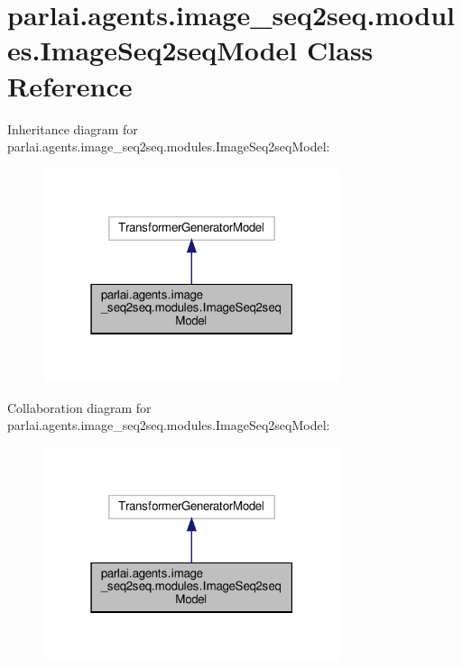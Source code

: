 \hypertarget{classparlai_1_1agents_1_1image__seq2seq_1_1modules_1_1ImageSeq2seqModel}{}\section{parlai.\+agents.\+image\+\_\+seq2seq.\+modules.\+Image\+Seq2seq\+Model Class Reference}
\label{classparlai_1_1agents_1_1image__seq2seq_1_1modules_1_1ImageSeq2seqModel}


Inheritance diagram for parlai.\+agents.\+image\+\_\+seq2seq.\+modules.\+Image\+Seq2seq\+Model\+:
\nopagebreak
\begin{figure}[H]
\begin{center}
\leavevmode
\includegraphics[width=247pt]{d1/dca/classparlai_1_1agents_1_1image__seq2seq_1_1modules_1_1ImageSeq2seqModel__inherit__graph}
\end{center}
\end{figure}


Collaboration diagram for parlai.\+agents.\+image\+\_\+seq2seq.\+modules.\+Image\+Seq2seq\+Model\+:
\nopagebreak
\begin{figure}[H]
\begin{center}
\leavevmode
\includegraphics[width=247pt]{dd/d56/classparlai_1_1agents_1_1image__seq2seq_1_1modules_1_1ImageSeq2seqModel__coll__graph}
\end{center}
\end{figure}
